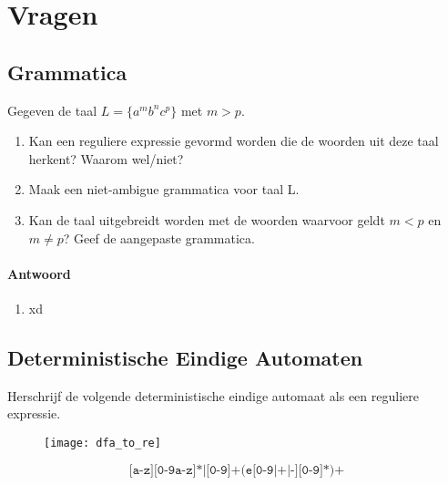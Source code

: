 \documentclass{report}
\newcommand{\answer}[1]{
		\subsubsection*{Antwoord}
			#1
}
\begin{document}
	\tableofcontents
	\chapter{Vragen}
	\newpage
\section{Grammatica}
	Gegeven de taal $L = \{a^mb^nc^p\}$ met $m > p$.
	\begin{enumerate}
		\item Kan een reguliere expressie gevormd worden die de woorden uit deze taal herkent? Waarom wel/niet?
		\item Maak een niet-ambigue grammatica voor taal L.
		\item Kan de taal uitgebreidt worden met de woorden waarvoor geldt $m < p$ en $m \neq p$? Geef de aangepaste grammatica.
	\end{enumerate} 

	\answer{
		\begin{enumerate}
			\item xd

		\end{enumerate}
	}
	\newpage
\section{Deterministische Eindige Automaten}
	Herschrijf de volgende deterministische eindige automaat als een reguliere expressie.
	\begin{figure}
		\texttt{[image: dfa\_to\_re]}
	\end{figure}
	$$\texttt{[a-z][0-9a-z]*|[0-9]+(e[0-9|+|-][0-9]*)+}$$
	\newpage
\end{document}
